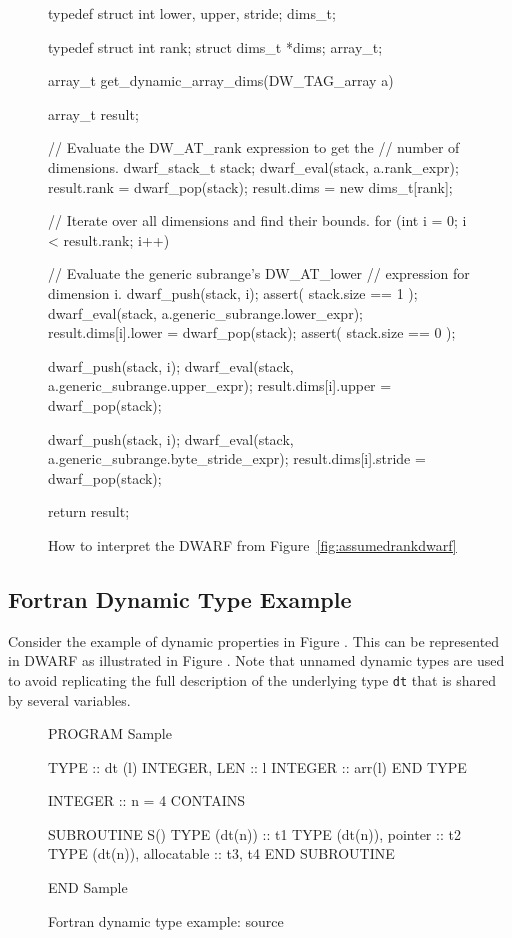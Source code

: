 \begin{figure}[!ht]
\begin{nlnlisting}
    typedef struct {
        int lower, upper, stride;
    } dims_t;

    typedef struct {
        int rank;
    struct dims_t *dims;
    } array_t;

    array_t get_dynamic_array_dims(DW_TAG_array a) {
      array_t result;

      // Evaluate the DW_AT_rank expression to get the 
      //    number of dimensions.
      dwarf_stack_t stack;
      dwarf_eval(stack, a.rank_expr);
      result.rank = dwarf_pop(stack); 
      result.dims = new dims_t[rank];

      // Iterate over all dimensions and find their bounds.
      for (int i = 0; i < result.rank; i++) {
        // Evaluate the generic subrange's DW_AT_lower 
        //    expression for dimension i.
        dwarf_push(stack, i);
        assert( stack.size == 1 );
        dwarf_eval(stack, a.generic_subrange.lower_expr);
        result.dims[i].lower = dwarf_pop(stack);
        assert( stack.size == 0 );

        dwarf_push(stack, i);
        dwarf_eval(stack, a.generic_subrange.upper_expr);
        result.dims[i].upper = dwarf_pop(stack);
    
        dwarf_push(stack, i);
        dwarf_eval(stack, a.generic_subrange.byte_stride_expr);
        result.dims[i].stride = dwarf_pop(stack);
      }
      return result;
    }
\end{nlnlisting}
\caption{How to interpret the DWARF from Figure~\ref{fig:assumedrankdwarf}}
\label{fig:assumedrankdwarfparser}
\end{figure}


\clearpage
\subsection{Fortran Dynamic Type Example}
\label{app:fortrandynamictypeexample}
Consider the  example of dynamic properties in 
Figure .
This can be represented in DWARF as illustrated in 
Figure .
Note that unnamed dynamic types are used to avoid replicating
the full description of the underlying type \texttt{dt} that is shared by
several variables.

\begin{figure}[ht]
\begin{nlnlisting}
	PROGRAM Sample
     
        TYPE :: dt (l)
            INTEGER, LEN :: l
            INTEGER :: arr(l)
        END TYPE

        INTEGER :: n = 4
        CONTAINS

        SUBROUTINE S()
            TYPE (dt(n))               :: t1
            TYPE (dt(n)), pointer      :: t2
            TYPE (dt(n)), allocatable  :: t3, t4
        END SUBROUTINE
     
        END Sample
\end{nlnlisting}
\caption{Fortran dynamic type example: source}
\label{fig:fortrandynamictypeexamplesource}
\end{figure}

